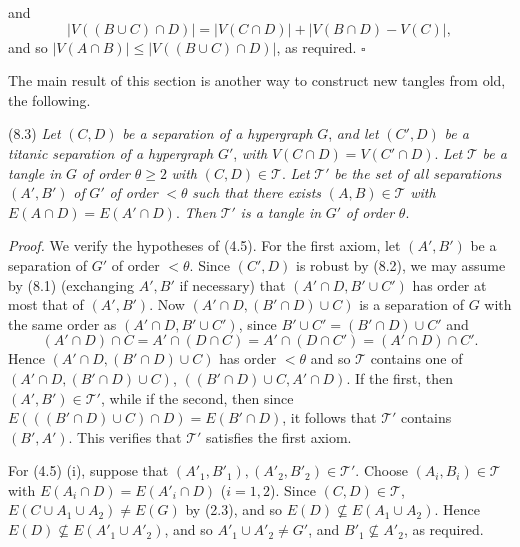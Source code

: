 \noindent and
\begin{equation*}
|V((B \cup C) \cap D)| = |V(C \cap D)| + |V(B \cap D) - V(C)|,
\end{equation*}
and so $|V(A \cap B)| \le |V((B \cup C) \cap D)|$, as required. $\square$

The main result of this section is another way to construct new tangles from old, the following.

\stmt
(8.3) \textit{Let} $(C, D)$ \textit{be a separation of a hypergraph} $G$, \textit{and let} $(C', D)$ \textit{be a titanic separation of a hypergraph} $G'$, \textit{with} $V(C \cap D) = V(C' \cap D)$. \textit{Let} $\mathscr{T}$ \textit{be a tangle in} $G$ \textit{of order} $\theta \ge 2$ \textit{with} $(C, D) \in \mathscr{T}$. \textit{Let} $\mathscr{T}'$ \textit{be the set of all separations} $(A', B')$ \textit{of} $G'$ \textit{of order} $<\theta$ \textit{such that there exists} $(A, B) \in \mathscr{T}$ \textit{with} $E(A \cap D) = E(A' \cap D)$. \textit{Then} $\mathscr{T}'$ \textit{is a tangle in} $G'$ \textit{of order} $\theta$.

\textit{Proof.} We verify the hypotheses of (4.5). For the first axiom, let $(A', B')$ be a separation of $G'$ of order $<\theta$. Since $(C', D)$ is robust by (8.2), we may assume by (8.1) (exchanging $A', B'$ if necessary) that $(A' \cap D, B' \cup C')$ has order at most that of $(A', B')$. Now $(A' \cap D, (B' \cap D) \cup C)$ is a separation of $G$ with the same order as $(A' \cap D, B' \cup C')$, since $B' \cup C' = (B' \cap D) \cup C'$ and
\begin{equation*}
(A' \cap D) \cap C = A' \cap (D \cap C) = A' \cap (D \cap C') = (A' \cap D) \cap C'.
\end{equation*}
Hence $(A' \cap D, (B' \cap D) \cup C)$ has order $<\theta$ and so $\mathscr{T}$ contains one of $(A' \cap D, (B' \cap D) \cup C)$, $((B' \cap D) \cup C, A' \cap D)$. If the first, then $(A', B') \in \mathscr{T}'$, while if the second, then since $E(((B' \cap D) \cup C) \cap D) = E(B' \cap D)$, it follows that $\mathscr{T}'$ contains $(B', A')$. This verifies that $\mathscr{T}'$ satisfies the first axiom.

For (4.5) (i), suppose that $(A'_1, B'_1), (A'_2, B'_2) \in \mathscr{T}'$. Choose $(A_i, B_i) \in \mathscr{T}$ with $E(A_i \cap D) = E(A'_i \cap D)$ ($i = 1, 2$). Since $(C, D) \in \mathscr{T}$, $E(C \cup A_1 \cup A_2) \ne E(G)$ by (2.3), and so $E(D) \nsubseteq E(A_1 \cup A_2)$. Hence $E(D) \nsubseteq E(A'_1 \cup A'_2)$, and so $A'_1 \cup A'_2 \ne G'$, and $B'_1 \nsubseteq A'_2$, as required.

